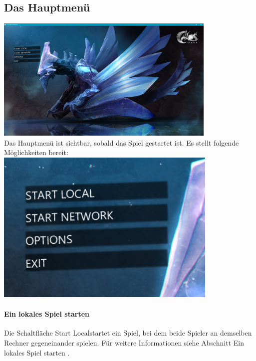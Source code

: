 \documentclass[a4paper,12pt]{scrartcl}
\begin{document}
	\subsection{Das Hauptmenü}
	\vspace{1em}
	\includegraphics[width=\textwidth]{Prog2_EA_V2/screenshots/Hauptmenu1.png}\\
	
	Das Hauptmenü ist sichtbar, sobald das Spiel gestartet ist. Es stellt folgende Möglichkeiten bereit:\\
	
	\includegraphics[width=\textwidth, height=20em]{Prog2_EA_V2/screenshots/Hauptmenu2.png}\\
	\paragraph{Ein lokales Spiel starten}
	Die Schaltfläche \glqq Start Local\grqq\hspace{0.05em}startet ein Spiel, bei dem beide Spieler an demselben Rechner gegeneinander spielen.
	Für weitere Informationen siehe Abschnitt \glqq Ein lokales Spiel starten \grqq.
\end{document}
